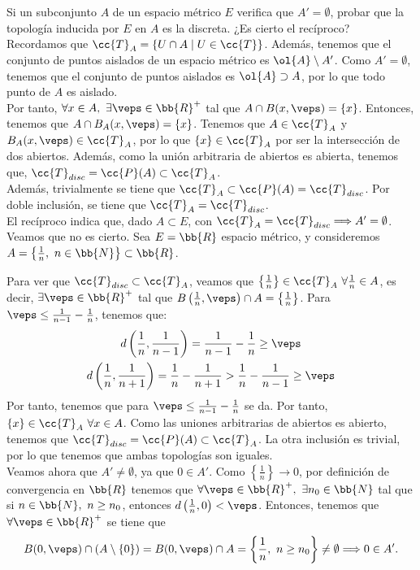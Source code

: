 \begin{ejercicio}
    Si un subconjunto $A$ de un espacio métrico $E$ verifica que $A'=\emptyset$, probar que la topología inducida por $E$ en $A$ es la discreta. ¿Es cierto el recíproco?\\

    Recordamos que $\cc{T}_A=\{U\cap A\mid U\in \cc{T}\}$. Además, tenemos que el conjunto de puntos aislados de un espacio métrico es $\ol{A}\setminus A'$. Como $A'=\emptyset$, tenemos que el conjunto de puntos aislados es $\ol{A}\supset A$, por lo que todo punto de $A$ es aislado.\\

    Por tanto, $\forall x\in A,~\exists \veps\in \bb{R}^+$ tal que $A\cap B(x,\veps)=\{x\}$. Entonces, tenemos que $A\cap B_A(x,\veps)=\{x\}$. Tenemos que $A\in \cc{T}_A$ y $B_A(x,\veps)\in \cc{T}_A$, por lo que $\{x\}\in \cc{T}_A$ por ser la intersección de dos abiertos. Además, como la unión arbitraria de abiertos es abierta, tenemos que, $\cc{T}_{disc}=\cc{P}(A)\subset \cc{T}_A$.\\

    Además, trivialmente se tiene que $\cc{T}_A\subset \cc{P}(A)=\cc{T}_{disc}$. Por doble inclusión, se tiene que $\cc{T}_A=\cc{T}_{disc}$.\\

    El recíproco indica que, dado $A\subset E$, con $\cc{T}_A=\cc{T}_{disc}\Longrightarrow A'=\emptyset$. Veamos que no es cierto. Sea $E=\bb{R}$ espacio métrico, y consideremos $A=\left\{\frac{1}{n},~n\in \bb{N}\right\}\subset \bb{R}$.

    Para ver que $\cc{T}_{disc}\subset \cc{T}_A$, veamos que $\left\{\frac{1}{n}\right\}\in \cc{T}_A~\forall \frac{1}{n}\in A$, es decir, $\exists \veps\in \bb{R}^+$ tal que $B\left(\frac{1}{n},\veps\right)\cap A=\left\{\frac{1}{n}\right\}$. Para $\veps\leq \frac{1}{n-1}-\frac{1}{n}$, tenemos que:
    \begin{gather*}
        d\left(\frac{1}{n},\frac{1}{n-1}\right) = \frac{1}{n-1}-\frac{1}{n} \geq \veps \\
        d\left(\frac{1}{n},\frac{1}{n+1}\right) = \frac{1}{n}-\frac{1}{n+1} > \frac{1}{n} - \frac{1}{n-1} \geq \veps
    \end{gather*}
    Por tanto, tenemos que para $\veps\leq \frac{1}{n-1}-\frac{1}{n}$ se da. Por tanto, $\left\{x\right\}\in \cc{T}_A~\forall x\in A$. Como las uniones arbitrarias de abiertos es abierto, tenemos que $\cc{T}_{disc}=\cc{P}(A)\subset \cc{T}_{A}$. La otra inclusión es trivial, por lo que tenemos que ambas topologías son iguales.\\

    Veamos ahora que $A'\neq \emptyset$, ya que $0\in A'$. Como $\left\{\frac{1}{n}\right\}\to 0$, por definición de convergencia en $\bb{R}$ tenemos que $\forall \veps\in \bb{R}^+,~\exists n_0\in \bb{N}$ tal que si $n\in \bb{N},~n\geq n_0$, entonces $d\left(\frac{1}{n},0\right)<\veps$. Entonces, tenemos que $\forall \veps\in \bb{R}^+$ se tiene que $$B(0,\veps)\cap (A\setminus \{0\})=B(0,\veps)\cap A = \left\{\frac{1}{n},~n\geq n_0\right\}\neq \emptyset\Longrightarrow 0\in A'.$$
\end{ejercicio}

